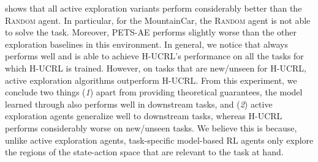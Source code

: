  shows that all active exploration variants perform considerably better than the \textsc{Random} agent. In particular, for the MountainCar, the \textsc{Random} agent is not able to solve the task. Moreover, \textsc{PETS-AE} performs slightly worse than the other exploration baselines in this environment.
In general, we notice that \opacex always performs well and is able to achieve \textsc{H-UCRL}'s performance on all the tasks for which \textsc{H-UCRL} is trained. 
However, on tasks that are new/unseen for \textsc{H-UCRL}, active exploration algorithms outperform \textsc{H-UCRL}. 
From this experiment, we conclude two things 
(\emph{1}) apart from providing theoretical guarantees, the model learned through \opacex 
also performs well in downstream tasks, and (\emph{2}) active exploration agents generalize well to downstream tasks, whereas \textsc{H-UCRL} performs considerably worse on new/unseen tasks.
We believe this is because, unlike active exploration agents, task-specific model-based RL agents only explore the regions of the state-action space that are relevant to the task at hand.


